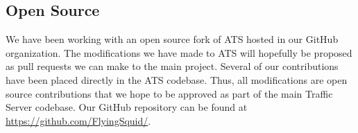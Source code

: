 \subsection{Open Source}

We have been working with an open source fork of ATS hosted in our GitHub organization. The modifications we have made to ATS will hopefully be proposed as pull requests we can make to the main project. Several of our contributions have been placed directly in the ATS codebase. Thus, all modifications are open source contributions that we hope to be approved as part of the main Traffic Server codebase. Our GitHub repository can be found at \url{https://github.com/FlyingSquid/}.